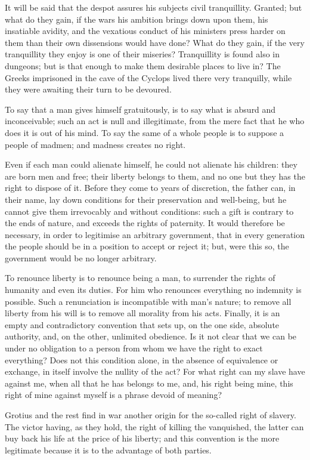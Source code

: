 \documentclass[12pt]{report}
\begin{document}
It will be said that the despot assures his subjects civil tranquillity. Granted; but what do they gain, if the wars his ambition brings down upon them, his insatiable avidity, and the vexatious conduct of his ministers press harder on them than their own dissensions would have done? What do they gain, if the very tranquillity they enjoy is one of their miseries? Tranquillity is found also in dungeons; but is that enough to make them desirable places to live in? The Greeks imprisoned in the cave of the Cyclops lived there very tranquilly, while they were awaiting their turn to be devoured.

To say that a man gives himself gratuitously, is to say what is absurd and inconceivable; such an act is null and illegitimate, from the mere fact that he who does it is out of his mind. To say the same of a whole people is to suppose a people of madmen; and madness creates no right.

Even if each man could alienate himself, he could not alienate his children: they are born men and free; their liberty belongs to them, and no one but they has the right to dispose of it. Before they come to years of discretion, the father can, in their name, lay down conditions for their preservation and well-being, but he cannot give them irrevocably and without conditions: such a gift is contrary to the ends of nature, and exceeds the rights of paternity. It would therefore be necessary, in order to legitimise an arbitrary government, that in every generation the people should be in a position to accept or reject it; but, were this so, the government would be no longer arbitrary.

To renounce liberty is to renounce being a man, to surrender the rights of humanity and even its duties. For him who renounces everything no indemnity is possible. Such a renunciation is incompatible with man's nature; to remove all liberty from his will is to remove all morality from his acts. Finally, it is an empty and contradictory convention that sets up, on the one side, absolute authority, and, on the other, unlimited obedience. Is it not clear that we can be under no obligation to a person from whom we have the right to exact everything? Does not this condition alone, in the absence of equivalence or exchange, in itself involve the nullity of the act? For what right can my slave have against me, when all that he has belongs to me, and, his right being mine, this right of mine against myself is a phrase devoid of meaning?

Grotius and the rest find in war another origin for the so-called right of slavery. The victor having, as they hold, the right of killing the vanquished, the latter can buy back his life at the price of his liberty; and this convention is the more legitimate because it is to the advantage of both parties.
\end{document}
